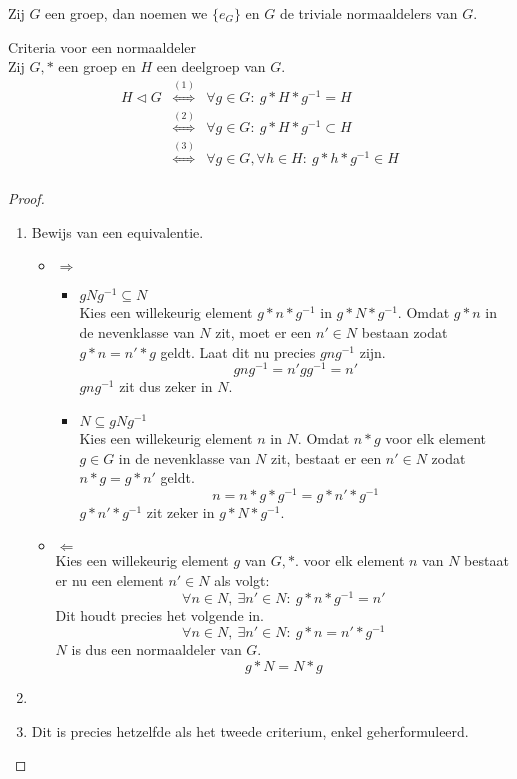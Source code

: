 \documentclass[main.tex]{subfiles}
\begin{document}
\begin{de}
  Zij $G$ een groep, dan noemen we $\{e_{G}\}$ en $G$ de triviale normaaldelers van $G$.
\end{de}

\begin{st}
  \label{st:criteria-voor-normaaldeler}
  Criteria voor een normaaldeler\\
  Zij $G,*$ een groep en $H$ een deelgroep van $G$.
  \[
  \begin{array}{rcl}
    H \triangleleft G &\overset{(1)}{\Leftrightarrow} & \forall g \in G:\ g*H*g^{-1} = H\\
                      &\overset{(2)}{\Leftrightarrow} & \forall g \in G:\ g*H*g^{-1} \subset H\\
                      &\overset{(3)}{\Leftrightarrow} & \forall g \in G,\forall h \in H:\ g*h*g^{-1} \in H\\
  \end{array}
  \]

  \begin{proof}
    \begin{enumerate}
    \item Bewijs van een equivalentie.
      \begin{itemize}
      \item $\Rightarrow$\\
        \begin{itemize}
        \item $gNg^{-1}\subseteq N$\\
          Kies een willekeurig element $g*n*g^{-1}$ in $g*N*g^{-1}$.
          Omdat $g*n$ in de nevenklasse van $N$ zit, moet er een $n'\in N$ bestaan zodat $g*n =n'*g$ geldt.
          Laat dit nu precies $gng^{-1}$ zijn.
          \[ gng^{-1} = n'gg^{-1} = n' \]
          $gng^{-1}$ zit dus zeker in $N$.\\
        \item $N \subseteq gNg^{-1}$\\
          Kies een willekeurig element $n$ in $N$.
          Omdat $n*g$ voor elk element $g\in G$ in de nevenklasse van $N$ zit, bestaat er een $n'\in N$ zodat $n*g = g*n'$ geldt.
          \[ n = n * g * g^{-1} = g*n'*g^{-1}\]
          $g*n'*g^{-1}$ zit zeker in $g*N*g^{-1}$.
        \end{itemize}
      \item $\Leftarrow$\\
        Kies een willekeurig element $g$ van $G,*$. voor elk element $n$ van $N$ bestaat er nu een element $n'\in N$ als volgt:
        \[ \forall n\in N,\ \exists n'\in N:\ g*n*g^{-1} =n' \]
        Dit houdt precies het volgende in.
        \[ \forall n\in N,\ \exists n'\in N:\ g*n=n'*g^{-1} \]
        $N$ is dus een normaaldeler van $G$.
        \[ g*N = N*g \]
      \end{itemize}

    \item {}
    \item Dit is precies hetzelfde als het tweede criterium, enkel geherformuleerd.
    \end{enumerate}
  \end{proof}
\end{st}
\end{document}
